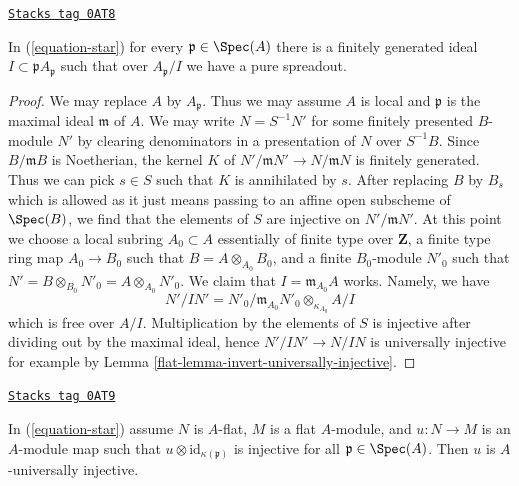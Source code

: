 \begin{lemma}
\label{flat-lemma-find-pure-spreadout}
\href{https://stacks.math.columbia.edu/tag/0AT8}{\texttt{Stacks tag 0AT8}}

In (\ref{equation-star}) for every $\mathfrak p \in \Spec(A)$
there is a finitely generated ideal $I \subset \mathfrak pA_\mathfrak p$
such that over $A_\mathfrak p/I$ we have a pure spreadout.
\end{lemma}

\begin{proof}

We may replace $A$ by $A_\mathfrak p$. Thus we may assume $A$ is
local and $\mathfrak p$ is the maximal ideal $\mathfrak m$ of $A$.
We may write $N = S^{-1}N'$ for some finitely presented $B$-module $N'$
by clearing denominators in a presentation of $N$ over $S^{-1}B$.
Since $B/\mathfrak m B$ is Noetherian, the kernel $K$ of
$N'/\mathfrak m N' \to N/\mathfrak m N$ is finitely generated.
Thus we can pick $s \in S$ such that $K$ is annihilated by $s$.
After replacing $B$ by $B_s$ which is allowed as it just means passing
to an affine open subscheme of $\Spec(B)$, we find that the elements of $S$
are injective on $N'/\mathfrak m N'$. At this point we choose
a local subring $A_0 \subset A$ essentially of finite type over $\mathbf{Z}$,
a finite type ring map $A_0 \to B_0$ such that $B = A \otimes_{A_0} B_0$,
and a finite $B_0$-module $N'_0$ such that
$N' = B \otimes_{B_0} N'_0 = A \otimes_{A_0} N'_0$.
We claim that $I = \mathfrak m_{A_0} A$ works.
Namely, we have
$$
N'/IN' = N'_0/\mathfrak m_{A_0} N'_0 \otimes_{\kappa_{A_0}} A/I
$$
which is free over $A/I$. Multiplication by the elements of $S$
is injective after dividing out by the maximal ideal, hence
$N'/IN' \to N/IN$ is universally injective for example by
Lemma \ref{flat-lemma-invert-universally-injective}.
\end{proof}

\begin{lemma}
\label{flat-lemma-universally-injective-if-flat}
\href{https://stacks.math.columbia.edu/tag/0AT9}{\texttt{Stacks tag 0AT9}}

In (\ref{equation-star}) assume $N$ is $A$-flat, $M$ is a flat $A$-module,
and $u : N \to M$ is an $A$-module map such that
$u \otimes \text{id}_{\kappa(\mathfrak p)}$ is injective for all
$\mathfrak p \in \Spec(A)$. Then $u$ is $A$-universally injective.
\end{lemma}

